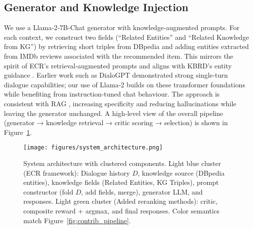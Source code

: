 \documentclass[12pt]{article}
\begin{document}
  \subsection{Generator and Knowledge Injection}
  We use a Llama‑2‑7B‑Chat generator \citep{meta2023llama2} with knowledge‑augmented prompts. For each context, we construct two fields (``Related Entities'' and ``Related Knowledge from KG'') by retrieving short triples from DBpedia and adding entities extracted from IMDb reviews associated with the recommended item. This mirrors the spirit of ECR's retrieval‑augmented prompts \citep{zhang2024ecr} and aligns with KBRD's entity guidance \citep{chen2020kbrd}. Earlier work such as DialoGPT \citep{zhang2019dialogpt} demonstrated strong single‑turn dialogue capabilities; our use of Llama‑2 builds on these transformer foundations while benefiting from instruction‑tuned chat behaviour. The approach is consistent with RAG \citep{lewis2020rag}, increasing specificity and reducing hallucinations while leaving the generator unchanged. A high‑level view of the overall pipeline (generator → knowledge retrieval → critic scoring → selection) is shown in Figure~\ref{fig:system}.
  
  \begin{figure}[h]
  \centering
  \texttt{[image: figures/system\_architecture.png]}
  \caption{System architecture with clustered components. Light blue cluster (ECR framework): Dialogue history \(D\), knowledge source (DBpedia entities), knowledge fields (Related Entities, KG Triples), prompt constructor (fold \(D\), add fields, merge), generator LLM, and responses. Light green cluster (Added reranking methods): critic, composite reward + argmax, and final responses. Color semantics match Figure~\ref{fig:contrib_pipeline}.}
  \label{fig:system}
  \end{figure}
  
\end{document}
